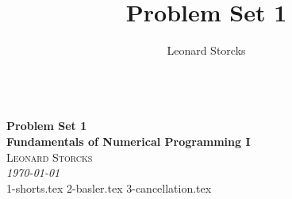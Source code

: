 \documentclass[a4paper, 12pt]{article}
\title{Problem Set 1}
\author{Leonard Storcks}
\theoremstyle{definition}
\begin{document}
\pagestyle{plain}
{\noindent\Huge\bf  \\[0.5\baselineskip] {\selectfont  Problem Set 1}}\\[2\baselineskip]
{ {\bf {}\selectfont Fundamentals of Numerical Programming I}\\
{\textsc{Leonard Storcks}} \\
{\textit{\selectfont     \today}}}
\\[1.4\baselineskip] 


{1-shorts.tex}
{2-basler.tex}
{3-cancellation.tex}



\end{document}
